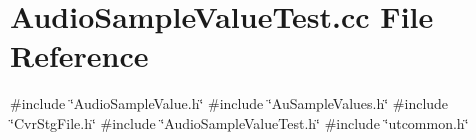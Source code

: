 \section{Audio\+Sample\+Value\+Test.\+cc File Reference}
\label{AudioSampleValueTest_8cc}
{\ttfamily \#include \char`\"{}Audio\+Sample\+Value.\+h\char`\"{}}\newline
{\ttfamily \#include \char`\"{}Au\+Sample\+Values.\+h\char`\"{}}\newline
{\ttfamily \#include \char`\"{}Cvr\+Stg\+File.\+h\char`\"{}}\newline
{\ttfamily \#include \char`\"{}Audio\+Sample\+Value\+Test.\+h\char`\"{}}\newline
{\ttfamily \#include \char`\"{}utcommon.\+h\char`\"{}}\newline
